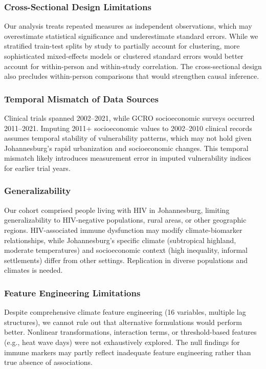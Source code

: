 \subsubsection{Cross-Sectional Design Limitations}

Our analysis treats repeated measures as independent observations, which may overestimate statistical significance and underestimate standard errors. While we stratified train-test splits by study to partially account for clustering, more sophisticated mixed-effects models or clustered standard errors would better account for within-person and within-study correlation. The cross-sectional design also precludes within-person comparisons that would strengthen causal inference.

\subsubsection{Temporal Mismatch of Data Sources}

Clinical trials spanned 2002--2021, while GCRO socioeconomic surveys occurred 2011--2021. Imputing 2011+ socioeconomic values to 2002--2010 clinical records assumes temporal stability of vulnerability patterns, which may not hold given Johannesburg's rapid urbanization and socioeconomic changes. This temporal mismatch likely introduces measurement error in imputed vulnerability indices for earlier trial years.

\subsubsection{Generalizability}

Our cohort comprised people living with HIV in Johannesburg, limiting generalizability to HIV-negative populations, rural areas, or other geographic regions. HIV-associated immune dysfunction may modify climate-biomarker relationships, while Johannesburg's specific climate (subtropical highland, moderate temperatures) and socioeconomic context (high inequality, informal settlements) differ from other settings. Replication in diverse populations and climates is needed.

\subsubsection{Feature Engineering Limitations}

Despite comprehensive climate feature engineering (16 variables, multiple lag structures), we cannot rule out that alternative formulations would perform better. Nonlinear transformations, interaction terms, or threshold-based features (e.g., heat wave days) were not exhaustively explored. The null findings for immune markers may partly reflect inadequate feature engineering rather than true absence of associations.

